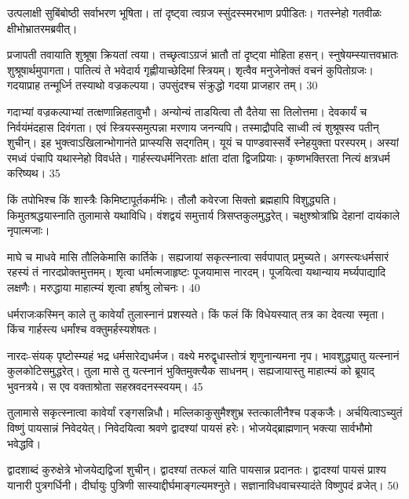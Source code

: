   उत्पलाक्षी सुबिंबोष्ठी सर्वाभरण भूषिता।
 तां दृष्ट्वा त्वग्रज स्सुंदस्स्मरभाण प्रपीडितः।
 गतस्नेहो गतवीळः क्षीभोभ्रातरमब्रवीत्।
 
प्रजापती तवायाति शुश्रूषा क्रियतां त्वया।
 तच्छृत्वाऽग्रजं भ्रातौ तां दृष्ट्वा मोहिता हसन्।
 स्नुषेयम्स्यात्तवभ्रातः शुश्रूषार्थमुपागता।
 पातित्यं ते भवेदार्य गृह्णीयाच्छेदिमां स्त्रियम्।
 शृत्वैव मनुजेनोक्तं वचनं कुपितोग्रजः।
 गदयाप्राह तन्मूर्ध्नि तस्याथो वज्रकल्पया।
 उपसुंदश्च संक्रुद्धो गदया प्राजहार तम्।
 30

  गदाभ्यां वज्रकल्पाभ्यां तत्क्षणान्निहतावुभौ।
 अन्योन्यं ताडयित्वा तौ दैतेया सा तिलोत्तमा।
 देवकार्यं च निर्वयंमंदहास दिवंगता।
 एवं स्त्रियस्समुत्पन्ना मरणाय जनन्यपि।
 तस्माद्रौपदि साध्वी त्वं शुश्रूषस्व पतीन् शुचीन्।
 इह भुक्त्वाऽखिलान्भोगानंते प्राप्स्यसि सद्गतिम्।
 यूयं च पाण्डवास्सर्वे स्नेहयुक्ता परस्परम्।
 अस्यां रमध्वं पंचापि यथास्नेहो विवर्धते।
 गार्हस्त्यधर्मनिरताः क्षांता दांता द्विजप्रियाः।
 कृष्णभक्तिरता नित्यं क्षत्रधर्म करिष्यथ।
 35

  किं तपोभिश्च किं शास्त्रैः किमिष्टापूर्तकर्मभिः।
 तौलौ कवेरजा सिक्तो ब्रह्महापि विशुद्ध्यति।
 किमुतश्रद्धयास्नाति तुलामासे यथाविधि।
 वंशद्वयं समुत्तार्य त्रिसप्तकुलमुद्धरेत्।
 चक्षुश्श्रोत्रांघ्रि देहानां दायंकाले नृपात्मजाः।
 
माघे च माधवे मासि तौलिकेमासि कार्तिके।
 सह्यजायां सकृत्स्नात्वा सर्वपापात् प्रमुच्यते।
 अगस्त्यःधर्मसारं रहस्यं तं नारदप्रोक्तमुत्तमम्।
 शृत्वा धर्मात्मजाहृष्टः पूजयामास नारदम्।
 पूजयित्वा यथान्याय मर्घ्यपाद्यादि लक्षणैः।
 मरुद्धाया माहात्म्यं शृत्वा हर्षाश्रु लोचनः।
 40

  धर्मराजःकस्मिन् काले तु कावेर्यां तुलास्नानं प्रशस्यते।
 किं फलं किं विधेयस्यात् तत्र का देवत्या स्मृता।
 किंच गार्हस्त्य धर्मांश्च वक्तुमर्हस्यशेषतः।
 
नारदः-संयक् पृष्टोस्म्यहं भद्र धर्मसारेद्यधर्मज।
 वक्ष्ये मरुद्वृधास्तोत्रं शृणुनान्यमना नृप।
 भावशुद्ध्यातु यत्स्नानं कुलकोटिसमुद्धरेत्।
 तुला मासे तु यत्स्नानं भुक्तिमुक्त्यैक साधनम्।
 सह्यजायास्तु माहात्म्यं को ब्रूयाद् भुवनत्रये।
 स एव वक्ताश्रोता सहस्रवदनस्स्वयम्।
 45

  तुलामासे सकृत्स्नात्वा कावेर्यां रङ्गसन्निधौ।
 मल्लिकाकुसुमैश्शुभ्र स्तत्कालीनैश्च पङ्कजैः।
 अर्चयित्वाऽच्युतं विष्णुं पायसान्नं निवेदयेत्।
 निवेदयित्वा श्रवणे द्वादश्यां पायसं हरेः।
 भोजयेद्ब्राह्मणान् भक्त्या सार्वभौमो भवेद्धवि।
 
द्वादशाब्दं कुरुक्षेत्रे भोजयेद्यद्विजां शुचीन्।
 द्वादश्यां तत्फलं याति पायसान्न प्रदानतः।
 द्वादश्यां पायसं प्राश्य यानारी पुत्रगर्धिनी।
 दीर्घायुः पुत्रिणी सास्याद्दीर्घमाङ्गल्यमश्नुते।
 सज्ञानाविधवाचस्यादंते विष्णुपदं व्रजेत्।
 50

